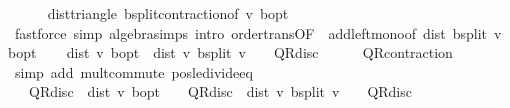 \begin{isabellebody}
\ \ \ \ \isamarkupfalse%
\ dist{\isacharunderscore}{\kern0pt}triangle\ {\isasymL}\isactrlsub b{\isacharunderscore}{\kern0pt}split{\isacharunderscore}{\kern0pt}contraction{\isacharbrackleft}{\kern0pt}of\ v\ {\isachardoublequoteopen}{\isasymnu}\isactrlsub b{\isacharunderscore}{\kern0pt}opt{\isachardoublequoteclose}{\isacharbrackright}{\kern0pt}\isanewline
\ \ \ \ \isamarkupfalse%
\ {\isacharparenleft}{\kern0pt}fastforce\ simp{\isacharcolon}{\kern0pt}\ algebra{\isacharunderscore}{\kern0pt}simps\ intro{\isacharcolon}{\kern0pt}\ order{\isachardot}{\kern0pt}trans{\isacharbrackleft}{\kern0pt}OF\ {\isacharunderscore}{\kern0pt}\ add{\isacharunderscore}{\kern0pt}left{\isacharunderscore}{\kern0pt}mono{\isacharbrackleft}{\kern0pt}of\ {\isachardoublequoteopen}dist\ {\isacharparenleft}{\kern0pt}{\isasymL}\isactrlsub b{\isacharunderscore}{\kern0pt}split\ v{\isacharparenright}{\kern0pt}\ {\isasymnu}\isactrlsub b{\isacharunderscore}{\kern0pt}opt{\isachardoublequoteclose}{\isacharbrackright}{\kern0pt}{\isacharbrackright}{\kern0pt}{\isacharparenright}{\kern0pt}\isanewline
\ \ \isamarkupfalse%
\ {\isachardoublequoteopen}dist\ v\ {\isasymnu}\isactrlsub b{\isacharunderscore}{\kern0pt}opt\ {\isasymle}\ dist\ v\ {\isacharparenleft}{\kern0pt}{\isasymL}\isactrlsub b{\isacharunderscore}{\kern0pt}split\ v{\isacharparenright}{\kern0pt}\ {\isacharslash}{\kern0pt}\ {\isacharparenleft}{\kern0pt}{}\ {\isacharminus}{\kern0pt}\ QR{\isacharunderscore}{\kern0pt}disc{\isacharparenright}{\kern0pt}{\isachardoublequoteclose}\isanewline
\ \ \ \ \isamarkupfalse%
\ QR{\isacharunderscore}{\kern0pt}contraction\isanewline
\ \ \ \ \isamarkupfalse%
\ {\isacharparenleft}{\kern0pt}simp\ add{\isacharcolon}{\kern0pt}\ mult{\isachardot}{\kern0pt}commute\ pos{\isacharunderscore}{\kern0pt}le{\isacharunderscore}{\kern0pt}divide{\isacharunderscore}{\kern0pt}eq{\isacharparenright}{\kern0pt}\isanewline
\ \ \isamarkupfalse%
\ {\isachardoublequoteopen}{}\ {\isacharasterisk}{\kern0pt}\ QR{\isacharunderscore}{\kern0pt}disc\ {\isacharasterisk}{\kern0pt}\ dist\ v\ {\isasymnu}\isactrlsub b{\isacharunderscore}{\kern0pt}opt\ {\isasymle}\ {}\ {\isacharasterisk}{\kern0pt}\ QR{\isacharunderscore}{\kern0pt}disc\ {\isacharasterisk}{\kern0pt}\ {\isacharparenleft}{\kern0pt}dist\ v\ {\isacharparenleft}{\kern0pt}{\isasymL}\isactrlsub b{\isacharunderscore}{\kern0pt}split\ v{\isacharparenright}{\kern0pt}\ {\isacharslash}{\kern0pt}\ {\isacharparenleft}{\kern0pt}{}\ {\isacharminus}{\kern0pt}\ QR{\isacharunderscore}{\kern0pt}disc{\isacharparenright}{\kern0pt}{\isacharparenright}{\kern0pt}{\isachardoublequoteclose}\isanewline

\end{isabellebody}
